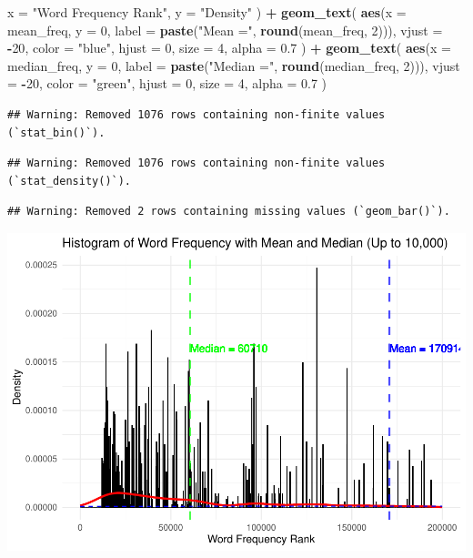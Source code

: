 \documentclass[
]{article}
\newenvironment{Shaded}{\begin{snugshade}}{\end{snugshade}}
\newcommand{\AttributeTok}[1]{\textcolor[rgb]{0.13,0.29,0.53}{#1}}
\newcommand{\DecValTok}[1]{\textcolor[rgb]{0.00,0.00,0.81}{#1}}
\newcommand{\FloatTok}[1]{\textcolor[rgb]{0.00,0.00,0.81}{#1}}
\newcommand{\FunctionTok}[1]{\textcolor[rgb]{0.13,0.29,0.53}{\textbf{#1}}}
\newcommand{\NormalTok}[1]{#1}
\newcommand{\SpecialCharTok}[1]{\textcolor[rgb]{0.81,0.36,0.00}{\textbf{#1}}}
\newcommand{\StringTok}[1]{\textcolor[rgb]{0.31,0.60,0.02}{#1}}
\begin{document}
\begin{Shaded}
\begin{Highlighting}[]
    \AttributeTok{x =} \StringTok{"Word Frequency Rank"}\NormalTok{,}
    \AttributeTok{y =} \StringTok{"Density"}
\NormalTok{  ) }\SpecialCharTok{+}
  \FunctionTok{geom\_text}\NormalTok{(}
    \FunctionTok{aes}\NormalTok{(}\AttributeTok{x =}\NormalTok{ mean\_freq, }\AttributeTok{y =} \DecValTok{0}\NormalTok{, }\AttributeTok{label =} \FunctionTok{paste}\NormalTok{(}\StringTok{"Mean ="}\NormalTok{, }\FunctionTok{round}\NormalTok{(mean\_freq, }\DecValTok{2}\NormalTok{))), }
    \AttributeTok{vjust =} \SpecialCharTok{{-}}\DecValTok{20}\NormalTok{, }
    \AttributeTok{color =} \StringTok{"blue"}\NormalTok{, }
    \AttributeTok{hjust =} \DecValTok{0}\NormalTok{, }
    \AttributeTok{size =} \DecValTok{4}\NormalTok{, }
    \AttributeTok{alpha =} \FloatTok{0.7}
\NormalTok{  ) }\SpecialCharTok{+}
  \FunctionTok{geom\_text}\NormalTok{(}
    \FunctionTok{aes}\NormalTok{(}\AttributeTok{x =}\NormalTok{ median\_freq, }\AttributeTok{y =} \DecValTok{0}\NormalTok{, }\AttributeTok{label =} \FunctionTok{paste}\NormalTok{(}\StringTok{"Median ="}\NormalTok{, }\FunctionTok{round}\NormalTok{(median\_freq, }\DecValTok{2}\NormalTok{))), }
    \AttributeTok{vjust =} \SpecialCharTok{{-}}\DecValTok{20}\NormalTok{, }
    \AttributeTok{color =} \StringTok{"green"}\NormalTok{, }
    \AttributeTok{hjust =} \DecValTok{0}\NormalTok{, }
    \AttributeTok{size =} \DecValTok{4}\NormalTok{, }
    \AttributeTok{alpha =} \FloatTok{0.7}
\NormalTok{  )}
\end{Highlighting}
\end{Shaded}

\begin{verbatim}
## Warning: Removed 1076 rows containing non-finite values (`stat_bin()`).
\end{verbatim}

\begin{verbatim}
## Warning: Removed 1076 rows containing non-finite values (`stat_density()`).
\end{verbatim}

\begin{verbatim}
## Warning: Removed 2 rows containing missing values (`geom_bar()`).
\end{verbatim}

\includegraphics{EDA_DavidMC_files/figure-latex/unnamed-chunk-17-1.pdf}
\end{document}
